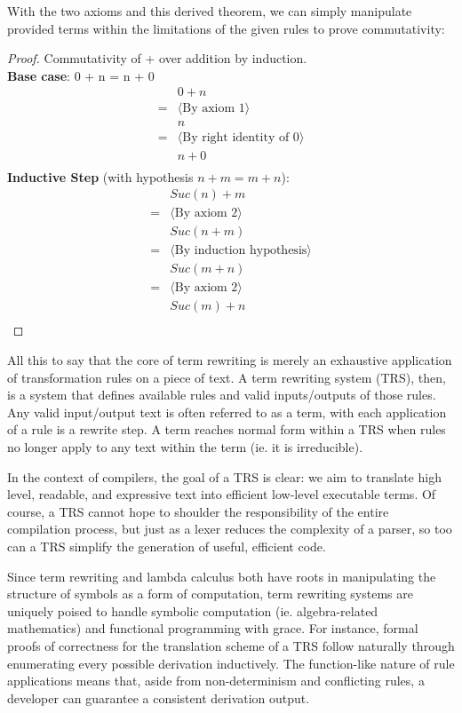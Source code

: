 \documentclass{article}
\begin{document}
With the two axioms and this derived theorem, we can simply manipulate provided terms within the limitations of the given rules to prove commutativity:
\begin{proof}
    Commutativity of + over addition by induction.
    \\
    \textbf{Base case}: 0 + n = n + 0
\begin{align*}
    &0 + n\\
    = &\langle \text{By axiom 1} \rangle \\
    &n\\
    = &\langle \text{By right identity of 0} \rangle \\
    &n + 0\\
\end{align*}
\textbf{Inductive Step} (with hypothesis $n + m = m + n$):
\begin{align*}
    &Suc(n) + m\\
    = &\langle \text{By axiom 2} \rangle \\
    &Suc(n+m)\\
    = &\langle \text{By induction hypothesis} \rangle \\
    &Suc(m+n)\\
    = &\langle \text{By axiom 2} \rangle \\
    &Suc(m)+n\\
\end{align*}
\end{proof}

All this to say that the core of term rewriting is merely an exhaustive application of transformation rules on a piece of text.
A term rewriting system (TRS), then, is a system that defines available rules and valid inputs/outputs of those rules.
Any valid input/output text is often referred to as a term, with each application of a rule is a rewrite step.
A term reaches normal form within a TRS when rules no longer apply to any text within the term (ie. it is irreducible).

In the context of compilers, the goal of a TRS is clear: we aim to translate high level,
readable, and expressive text into efficient low-level executable terms. Of course,
a TRS cannot hope to shoulder the responsibility of the entire compilation process,
but just as a lexer reduces the complexity of a parser, so too can a TRS simplify the generation of useful, efficient code.

Since term rewriting and lambda calculus both have roots in manipulating the structure of symbols as a form of computation,
term rewriting systems are uniquely poised to handle symbolic computation (ie. algebra-related mathematics) and functional programming with grace.
For instance, formal proofs of correctness for the translation scheme of a TRS follow naturally through enumerating every possible derivation inductively.
The function-like nature of rule applications means that, aside from non-determinism and conflicting rules,
a developer can guarantee a consistent derivation output.
\end{document}
